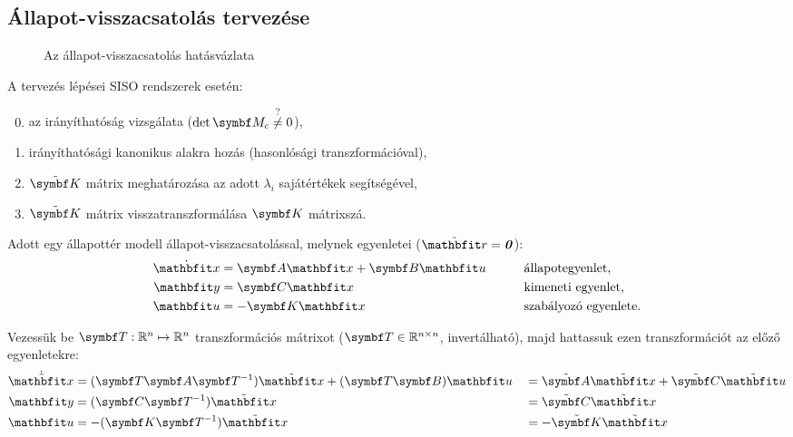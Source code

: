 \subsection{Állapot-visszacsatolás tervezése}

\begin{figure}[htb]
  \centering
  
  \caption{Az állapot-visszacsatolás hatásvázlata}
  \label{fig:state-feedback}
\end{figure}

A tervezés lépései SISO rendszerek esetén:
\begin{enumerate}[label={\color{darkRed}\theenumi})]
  \setcounter{enumi}{-1}
  \item az irányíthatóság vizsgálata ($\det \rmat M_c \overset{?}{\neq} 0$),
  \item irányíthatósági kanonikus alakra hozás (hasonlósági transzformációval),
  \item $\tilde{\rmat K}$ mátrix meghatározása az adott $\lambda_i$ sajátértékek
        segítségével,
  \item $\tilde{\rmat K}$ mátrix visszatranszformálása $\rmat K$ mátrixszá.
\end{enumerate}

Adott egy állapottér modell állapot-visszacsatolással, melynek egyenletei
($\tvec r = \nvec$):
\begin{alignat}{9}
  \dot{\rvec x} & = \rmat A \rvec x + \rmat B \rvec u \quad \quad
                &
                & \text{állapotegyenlet,}
  \\
  \rvec y       & = \rmat C \rvec x
                &
                & \text{kimeneti egyenlet,}
  \\
  \rvec u       & = - \rmat K \rvec x
                &
                & \text{szabályozó egyenlete.}
\end{alignat}

Vezessük be $\rmat T: \mathbb R^n \mapsto \mathbb R^n$ transzformációs mátrixot
($\rmat T \in \mathbb R^{n \times n}$, invertálható), majd hattassuk ezen
transzformációt az előző egyenletekre:
\begin{alignat}{9}
	\dot{\tvec x} & = (\rmat T \rmat A \rmat T^{-1}) \tvec x + (\rmat T \rmat B) \rvec u
                && = \tmat A \tvec x + \tmat C \tvec u
	\\
	\rvec y       & = (\rmat C \rmat T^{-1}) \tvec x
                && = \tmat C \tvec x
	\\
	\rvec u       & = - (\rmat K \rmat T^{-1}) \tvec x
                && = - \tmat K \tvec x
\end{alignat}

